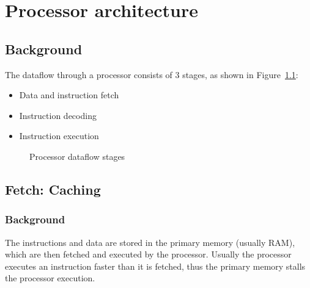 \documentclass{report}
\begin{document}
\chapter{Processor architecture}

\section{Background}

The dataflow through a processor consists of 3 stages, as shown in
Figure~\ref{fig:processor-dataflow-stages}:

\begin{itemize}

\item Data and instruction fetch
\item Instruction decoding
\item Instruction execution

\end{itemize}

\begin{figure}[H]
\centering
{}
\caption{Processor dataflow stages}\label{fig:processor-dataflow-stages}
\end{figure}



\section{Fetch: Caching}

\subsection{Background}

The instructions and data are stored in the primary memory (usually RAM), which
are then fetched and executed by the processor. Usually the processor executes
an instruction faster than it is fetched, thus the primary memory stalls the
processor execution.
\end{document}

